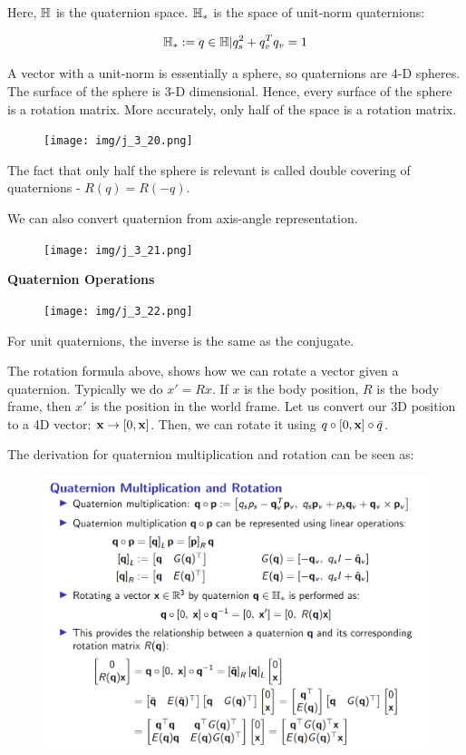 Here, $\mathbb{H}$ is the quaternion space. $\mathbb{H}_*$ is the space of unit-norm quaternions:

\begin{equation*}
    \mathbb{H}_* := {q\in \mathbb{H} | q_s^2 + q_v^Tq_v = 1}
\end{equation*}

A vector with a unit-norm is essentially a sphere, so quaternions are 4-D spheres. The surface of the sphere is 3-D dimensional. Hence, every surface of the sphere is a rotation matrix. More accurately, only half of the space is a rotation matrix.

\begin{figure}[h]\centering\texttt{[image: img/j\_3\_20.png]}\end{figure}

The fact that only half the sphere is relevant is called double covering of quaternions - $R(q) = R(-q)$.

We can also convert quaternion from axis-angle representation.

\begin{figure}[h]\centering\texttt{[image: img/j\_3\_21.png]}\end{figure}

\clearpage

\textbf{Quaternion Operations}

\begin{figure}[h]\centering\texttt{[image: img/j\_3\_22.png]}\end{figure}

For unit quaternions, the inverse is the same as the conjugate.

The rotation formula above, shows how we can rotate a vector given a quaternion. Typically we do $x' = Rx$. If $x$ is the body position, $R$ is the body frame, then $x'$ is the position in the world frame. Let us convert our 3D position to a 4D vector: $\textbf{x} \to [0, \textbf{x}]$. Then, we can rotate it using $q\circ [0, \textbf{x}]\circ \bar{q}$.

The derivation for quaternion multiplication and rotation can be seen as:

\begin{figure}[h]\centering\includegraphics[width=12cm]{img/j_3_23.png}\end{figure}

